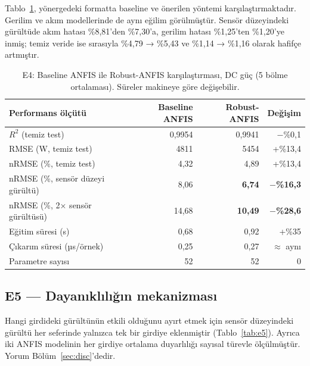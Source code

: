 \documentclass[11pt,a4paper]{article}
\begin{document}
Tablo~\ref{tab:e4}, yönergedeki formatta baseline ve önerilen yöntemi karşılaştırmaktadır. Gerilim ve akım modellerinde de aynı eğilim görülmüştür. Sensör düzeyindeki gürültüde akım hatası \%8,81'den \%7,30'a, gerilim hatası \%1,25'ten \%1,20'ye inmiş; temiz veride ise sırasıyla \%4,79 → \%5,43 ve \%1,14 → \%1,16 olarak hafifçe artmıştır.

\begin{table}[H]
\centering\small
\caption{E4: Baseline ANFIS ile Robust-ANFIS karşılaştırması, DC güç (5 bölme ortalaması). Süreler makineye göre değişebilir.}
\label{tab:e4}
\begin{tabular}{@{}lrrr@{}}
\toprule
Performans ölçütü & Baseline ANFIS & Robust-ANFIS & Değişim \\
\midrule
$R^2$ (temiz test) & 0,9954 & 0,9941 & $-$\%0,1 \\
RMSE (W, temiz test) & 4811 & 5454 & +\%13,4 \\
nRMSE (\%, temiz test) & 4,32 & 4,89 & +\%13,4 \\
nRMSE (\%, sensör düzeyi gürültü) & 8,06 & \textbf{6,74} & \textbf{$-$\%16,3} \\
nRMSE (\%, 2× sensör gürültüsü) & 14,68 & \textbf{10,49} & \textbf{$-$\%28,6} \\
Eğitim süresi (s) & 0,68 & 0,92 & +\%35 \\
Çıkarım süresi (µs/örnek) & 0,25 & 0,27 & $\approx$ aynı \\
Parametre sayısı & 52 & 52 & 0 \\
\bottomrule
\end{tabular}
\end{table}

\subsection{E5 — Dayanıklılığın mekanizması}
Hangi girdideki gürültünün etkili olduğunu ayırt etmek için sensör düzeyindeki gürültü her seferinde yalnızca tek bir girdiye eklenmiştir (Tablo~\ref{tab:e5}). Ayrıca iki ANFIS modelinin her girdiye ortalama duyarlılığı sayısal türevle ölçülmüştür. Yorum Bölüm~\ref{sec:disc}'dedir.
\end{document}

